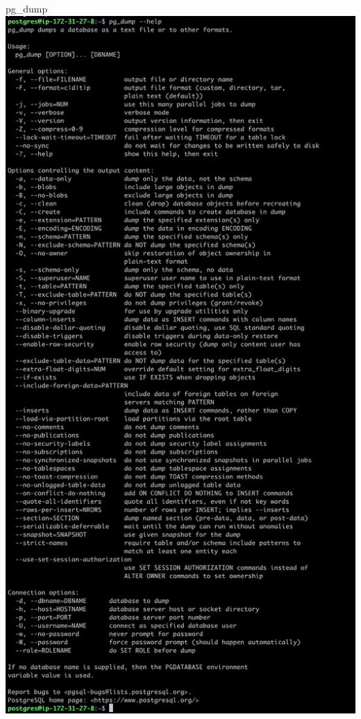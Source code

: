 \documentclass[aspectratio=169]{beamer}
\begin{document}
\begin{frame}{pg\_dump}
    \centering
    \includegraphics[width=\textwidth, trim={0cm 57.5cm 0cm 0.2cm}, clip]{figures/pg_dump}
\end{frame}
\end{document}
